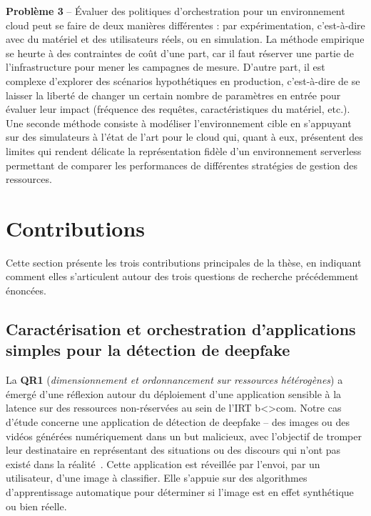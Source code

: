 \textbf{Problème 3} -- Évaluer des politiques d'orchestration pour un environnement cloud peut se faire de deux manières différentes : par expérimentation, c'est-à-dire avec du matériel et des utilisateurs réels, ou en simulation. La méthode empirique se heurte à des contraintes de coût d'une part, car il faut réserver une partie de l'infrastructure pour mener les campagnes de mesure. D'autre part, il est complexe d'explorer des scénarios hypothétiques en production, c'est-à-dire de se laisser la liberté de changer un certain nombre de paramètres en entrée pour évaluer leur impact (fréquence des requêtes, caractéristiques du matériel, etc.). Une seconde méthode consiste à modéliser l'environnement cible en s'appuyant sur des simulateurs à l'état de l'art pour le cloud qui, quant à eux, présentent des limites qui rendent délicate la représentation fidèle d'un environnement serverless permettant de comparer les performances de différentes stratégies de gestion des ressources.


\section{Contributions}

Cette section présente les trois contributions principales de la thèse, en indiquant comment elles s'articulent autour des trois questions de recherche précédemment énoncées.

\subsection{Caractérisation et orchestration d'applications simples pour la détection de deepfake}

La \textbf{QR1} (\textit{dimensionnement et ordonnancement sur ressources hétérogènes}) a émergé d'une réflexion autour du déploiement d'une application sensible à la latence sur des ressources non-réservées au sein de l'IRT b{\textless\textgreater}com. Notre cas d'étude concerne une application de détection de deepfake -- des images ou des vidéos générées numériquement dans un but malicieux, avec l'objectif de tromper leur destinataire en représentant des situations ou des discours qui n'ont pas existé dans la réalité~\cite{westerlundEmergenceDeepfakeTechnology2019}. Cette application est réveillée par l'envoi, par un utilisateur, d'une image à classifier. Elle s'appuie sur des algorithmes d'apprentissage automatique pour déterminer si l'image est en effet synthétique ou bien réelle.

